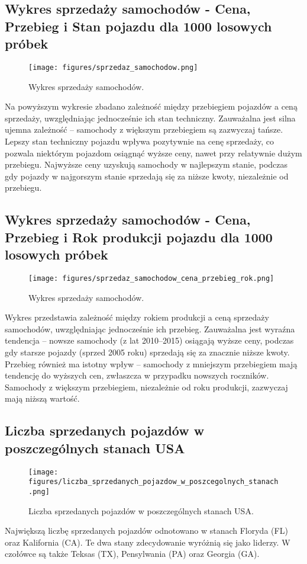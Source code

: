 \documentclass[10pt,letterpaper]{article}
\begin{document}
\subsection{Wykres sprzedaży samochodów - Cena, Przebieg i Stan pojazdu dla 1000 losowych próbek}
\begin{figure}[H]
\begin{center}
   \texttt{[image: figures/sprzedaz\_samochodow.png]}
   \caption{Wykres sprzedaży samochodów.}
   \label{fig:other-figure-log}
\end{center}
\end{figure}
Na powyższym wykresie zbadano zależność między przebiegiem pojazdów a ceną sprzedaży, uwzględniając jednocześnie ich stan techniczny. Zauważalna jest silna ujemna zależność – samochody z większym przebiegiem są zazwyczaj tańsze. Lepszy stan techniczny pojazdu wpływa pozytywnie na cenę sprzedaży, co pozwala niektórym pojazdom osiągnąć wyższe ceny, nawet przy relatywnie dużym przebiegu. Najwyższe ceny uzyskują samochody w najlepszym stanie, podczas gdy pojazdy w najgorszym stanie sprzedają się za niższe kwoty, niezależnie od przebiegu.

\subsection{Wykres sprzedaży samochodów - Cena, Przebieg i Rok produkcji pojazdu dla 1000 losowych próbek}
\begin{figure}[H]
\begin{center}
   \texttt{[image: figures/sprzedaz\_samochodow\_cena\_przebieg\_rok.png]}
   \caption{Wykres sprzedaży samochodów.}
   \label{fig:other-figure-log}
\end{center}
\end{figure}
Wykres przedstawia zależność między rokiem produkcji a ceną sprzedaży samochodów, uwzględniając jednocześnie ich przebieg. Zauważalna jest wyraźna tendencja – nowsze samochody (z lat 2010–2015) osiągają wyższe ceny, podczas gdy starsze pojazdy (sprzed 2005 roku) sprzedają się za znacznie niższe kwoty. Przebieg również ma istotny wpływ – samochody z mniejszym przebiegiem mają tendencję do wyższych cen, zwłaszcza w przypadku nowszych roczników. Samochody z większym przebiegiem, niezależnie od roku produkcji, zazwyczaj mają niższą wartość.

\subsection{Liczba sprzedanych pojazdów w poszczególnych stanach USA}
\begin{figure}[H]
\begin{center}
   \texttt{[image: figures/liczba\_sprzedanych\_pojazdow\_w\_poszcegolnych\_stanach.png]}
   \caption{Liczba sprzedanych pojazdów w poszczególnych stanach USA.}
   \label{fig:other-figure-log}
\end{center}
\end{figure}
Największą liczbę sprzedanych pojazdów odnotowano w stanach Floryda (FL) oraz Kalifornia (CA). Te dwa stany zdecydowanie wyróżnią się jako liderzy. W czołówce są także Teksas (TX), Pensylwania (PA) oraz Georgia (GA).
\end{document}
